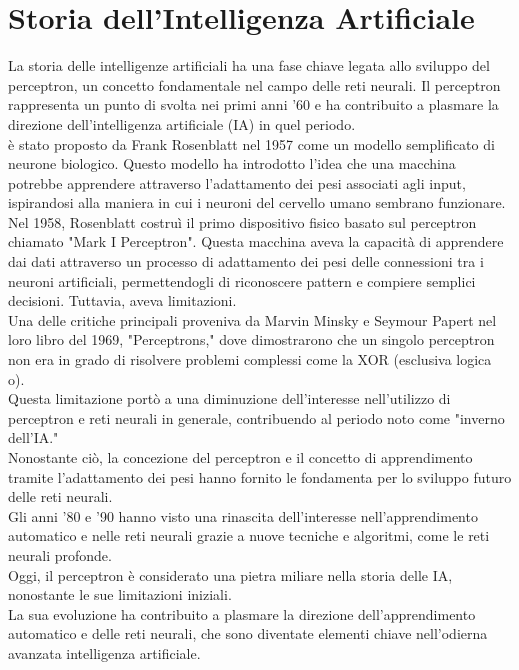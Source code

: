 \documentclass[12pt,a4paper]{report}
\begin{document}
\section{Storia dell'Intelligenza Artificiale}
La storia delle intelligenze artificiali ha una fase chiave legata allo sviluppo del perceptron, un concetto fondamentale nel campo delle reti neurali. Il perceptron rappresenta un punto di svolta nei primi anni '60 e ha contribuito a plasmare la direzione dell'intelligenza artificiale (IA) in quel periodo. \\
è stato proposto da Frank Rosenblatt nel 1957 come un modello semplificato di neurone biologico. Questo modello ha introdotto l'idea che una macchina potrebbe apprendere attraverso l'adattamento dei pesi associati agli input, ispirandosi alla maniera in cui i neuroni del cervello umano sembrano funzionare. \\
Nel 1958, Rosenblatt costruì il primo dispositivo fisico basato sul perceptron chiamato "Mark I Perceptron". Questa macchina aveva la capacità di apprendere dai dati attraverso un processo di adattamento dei pesi delle connessioni tra i neuroni artificiali, permettendogli di riconoscere pattern e compiere semplici decisioni.
Tuttavia, aveva limitazioni. \\
Una delle critiche principali proveniva da Marvin Minsky e Seymour Papert nel loro libro del 1969, "Perceptrons," dove dimostrarono che un singolo perceptron non era in grado di risolvere problemi complessi come la XOR (esclusiva logica o). \\
Questa limitazione portò a una diminuzione dell'interesse nell'utilizzo di perceptron e reti neurali in generale, contribuendo al periodo noto come "inverno dell'IA."\\
Nonostante ciò, la concezione del perceptron e il concetto di apprendimento tramite l'adattamento dei pesi hanno fornito le fondamenta per lo sviluppo futuro delle reti neurali. \\
Gli anni '80 e '90 hanno visto una rinascita dell'interesse nell'apprendimento automatico e nelle reti neurali grazie a nuove tecniche e algoritmi, come le reti neurali profonde.\\
Oggi, il perceptron è considerato una pietra miliare nella storia delle IA, nonostante le sue limitazioni iniziali.\\ La sua evoluzione ha contribuito a plasmare la direzione dell'apprendimento automatico e delle reti neurali, che sono diventate elementi chiave nell'odierna avanzata intelligenza artificiale.\\
\end{document}
